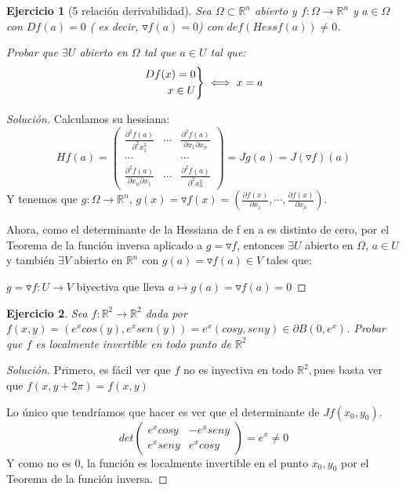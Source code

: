 \documentclass[11pt, a4paper, titlepage]{article}
\newcommand{\R}{\mathbb{R}}
\theoremstyle{exercise-style}
\newtheorem*{ejer}{Ejercicio}
\theoremstyle{theorem-style}
\newenvironment{rcases}
  {\left.\begin{aligned}}
  {\end{aligned}\right\rbrace}
\begin{document}
\begin{ejer}[5 relación derivabilidad]
	Sea $\Omega \subset \R^n$ abierto y $f:\Omega \to \R^n$ y $a\in \Omega$ con $Df(a) = 0$ ( es decir, $\triangledown f(a) = 0$) con $def(Hess f(a)) \ne 0$.
	
	Probar que $\exists U$ abierto en $\Omega$ tal que $a \in U$ tal que:
	\[
	\begin{rcases}
	Df(x) = 0\\
	x \in U
\end{rcases} \iff x = a
	\]
\end{ejer}
\begin{proof}[Solución]
	Calculamos su hessiana:
	\[
	Hf(a) = \begin{pmatrix} \frac{\partial^2f(a)}{\partial^2x_1^2}& \cdots & \frac{\partial^2f(a)}{\partial x_1 \partial x_n} \\ \cdots & & \cdots \\ \frac{\partial^2f(a)}{\partial x_n \partial x_1}& \cdots & \frac{\partial^2f(a)}{\partial^2x_n^2} \end{pmatrix} = Jg(a) = J(\triangledown f)(a)
	\]
Y tenemos que $g:\Omega \to \R^n$, $g(x) = \triangledown f(x) = ( \frac{\partial f(x)}{\partial x_1}, \cdots , \frac{\partial f(x)}{\partial x_n})$.

Ahora, como el determinante de la Hessiana de f en a es distinto de cero, por el Teorema de la función inversa aplicado a $g =  \triangledown f$, entonces $\exists U$ abierto en $\Omega$, $a\in U$ y también $\exists V$ abierto en $\R^n$ con $g(a) =  \triangledown f(a) \in V$
tales que:

$g = \triangledown f: U \to V$ biyectiva que lleva $a \mapsto g(a) =  \triangledown f(a) = 0$


\end{proof}
\begin{ejer}
	Sea $f:\R^2 \to \R^2$ dada por $f(x,y) = (e^x cos(y),e^x sen(y)) = e^x(cosy,seny) \in \partial B(0,e^x)$. Probar que $f$ es localmente invertible en todo punto de $\R^2$
\end{ejer}
\begin{proof}[Solución]
	Primero, es fácil ver que $f$ no es inyectiva en todo $\R^2,$pues basta ver que $f(x,y+2\pi) = f(x,y)$
	
	Lo único que tendríamos que hacer es ver que el determinante de $Jf (x_0,y_0)$.
	\[
det \begin{pmatrix} e^x cosy & -e^xseny \\ e^x seny & e^x cos y \end{pmatrix}  = e^x \ne 0
	\]
	Y como no es 0, la función es localmente invertible en el punto $x_0,y_0$ por el Teorema de la función inversa.

\end{proof}
\end{document}
